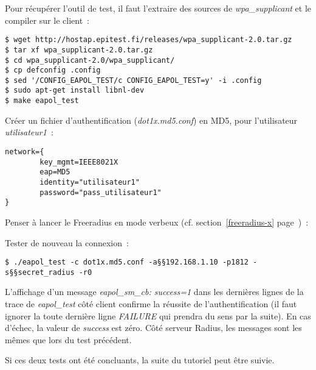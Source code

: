 \label{eapol-test}
Pour récupérer l'outil de test, il faut l'extraire des sources de \emph{wpa\_supplicant} et le compiler sur le client~:

\begin{lstlisting}
$ wget http://hostap.epitest.fi/releases/wpa_supplicant-2.0.tar.gz
$ tar xf wpa_supplicant-2.0.tar.gz
$ cd wpa_supplicant-2.0/wpa_supplicant/
$ cp defconfig .config
$ sed '/CONFIG_EAPOL_TEST/c CONFIG_EAPOL_TEST=y' -i .config
$ sudo apt-get install libnl-dev
$ make eapol_test
\end{lstlisting}

\label{auth-md5}
Créer un fichier d'authentification (\emph{dot1x.md5.conf}) en MD5, pour l'utilisateur \emph{utilisateur1}~:

\begin{lstlisting}
network={
        key_mgmt=IEEE8021X
        eap=MD5
        identity="utilisateur1"
        password="pass_utilisateur1"
}
\end{lstlisting}

Penser à lancer le Freeradius en mode verbeux (cf. section~\ref{freeradius-x} page~\pageref{freeradius-x})~:

Tester de nouveau la connexion~:

\begin{lstlisting}
$ ./eapol_test -c dot1x.md5.conf -a§§192.168.1.10 -p1812 -s§§secret_radius -r0
\end{lstlisting} 

L'affichage d'un message \og{}\emph{eapol\_sm\_cb: success=1}\fg{} dans les dernières lignes de la trace de \emph{eapol\_test} côté client confirme la réussite de l'authentification (il faut ignorer la toute dernière ligne \emph{FAILURE} qui prendra du sens par la suite). En cas d'échec, la valeur de \emph{success} est zéro. Côté serveur Radius, les messages sont les mêmes que lors du test précédent.

Si ces deux tests ont été concluants, la suite du tutoriel peut être suivie.
